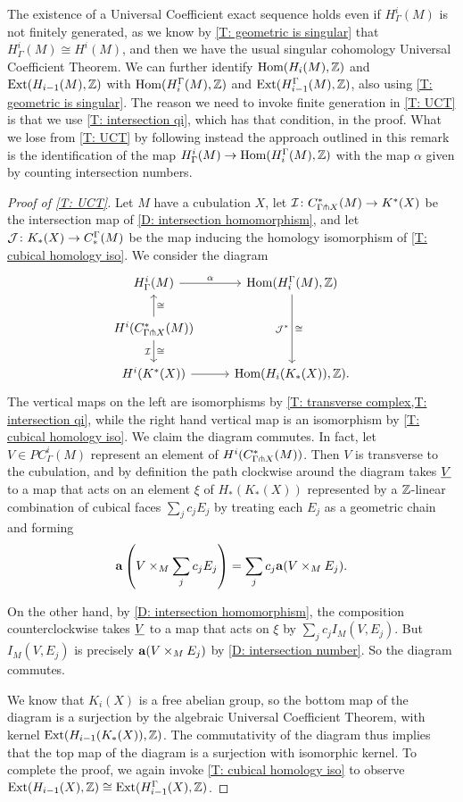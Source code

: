 \begin{remark}
	The existence of a Universal Coefficient exact sequence holds even if $H^i_\Gamma(M)$ is not finitely generated, as we know by \cref{T: geometric is singular} that $H^i_\Gamma(M) \cong H^i(M)$, and then we have the usual singular cohomology Universal Coefficient Theorem.
	We can further identify $\textup{Hom}(H_i(M),\mathbb{Z})$ and $\text{Ext}(H_{i-1}(M),\mathbb{Z})$ with $\textup{Hom}(H^\Gamma_i(M),\mathbb{Z})$ and $\text{Ext}(H^\Gamma_{i-1}(M),\mathbb{Z})$, also using \cref{T: geometric is singular}.
	The reason we need to invoke finite generation in \cref{T: UCT} is that we use \cref{T: intersection qi}, which has that condition, in the proof. What we lose from \cref{T: UCT} by following instead the approach outlined in this remark is the identification of the map $H^i_\Gamma(M) \to \textup{Hom}(H_i^\Gamma(M),\mathbb{Z})$ with the map $\alpha$ given by counting intersection numbers.
\end{remark}

\begin{proof}[Proof of \cref{T: UCT}]
	Let $M$ have a cubulation $X$, let $\mathcal{I} \colon C_{\Gamma \pitchfork X}^*(M) \to K^*(X)$ be the intersection map of \cref{D: intersection homomorphism},
	and let $\mathcal{J} \colon K_*(X) \to C^\Gamma_*(M)$ be the map inducing the homology isomorphism of \cref{T: cubical homology iso}.
	We consider the diagram
	\[
	\begin{tikzcd}
		H^i_\Gamma(M) \arrow[r, "\alpha"] & \Hom(H_i^\Gamma(M),\Z) \arrow[dd, "\cong", "\mc J^*"'] \\
		H^i(C^*_{\Gamma \pf X}(M)) \arrow[u, "\cong"'] \arrow[d, "\cong", "\mc I"'] & \\
		H^i(K^*(X)) \arrow[r] & \Hom(H_i(K_*(X)), \Z).
	\end{tikzcd}
	\]
	The vertical maps on the left are isomorphisms by \cref{T: transverse complex,T: intersection qi}, while the right hand vertical map is an isomorphism by \cref{T: cubical homology iso}.
	We claim the diagram commutes.
	In fact, let $V \in PC_\Gamma^i(M)$ represent an element of $H^i(C^*_{\Gamma \pitchfork X}(M))$.
	Then $V$ is transverse to the cubulation, and by definition the path clockwise around the diagram takes $\underline{V}$ to a map that acts on an element $\xi$ of $H_*(K_*(X))$ represented by a $\mathbb{Z}$-linear combination of cubical faces $\sum_j c_j E_j$ by treating each $E_j$ as a geometric chain and forming
	$$\mathbf{a}\left( V \times_M \sum_jc_jE_j\right) = \sum_jc_j\mathbf{a}(V \times_M E_j).$$

	On the other hand, by \cref{D: intersection homomorphism}, the composition counterclockwise takes $\underline{V}$ to a map that acts on $\xi$ by $\sum_j c_j I_M(V,E_j)$.
	But $I_M(V,E_j)$ is precisely $\mathbf{a}(V \times_M E_j)$ by \cref{D: intersection number}.
	So the diagram commutes.

	We know that $K_i(X)$ is a free abelian group, so the bottom map of the diagram is a surjection by the algebraic Universal Coefficient Theorem, with kernel $\text{Ext}(H_{i-1}(K_*(X)),\mathbb{Z})$.
	The commutativity of the diagram thus implies that the top map of the diagram is a surjection with isomorphic kernel.
	To complete the proof, we again invoke \cref{T: cubical homology iso} to observe $\text{Ext}(H_{i-1}(X),\mathbb{Z}) \cong \text{Ext}(H^\Gamma_{i-1}(X),\mathbb{Z})$.
\end{proof}

